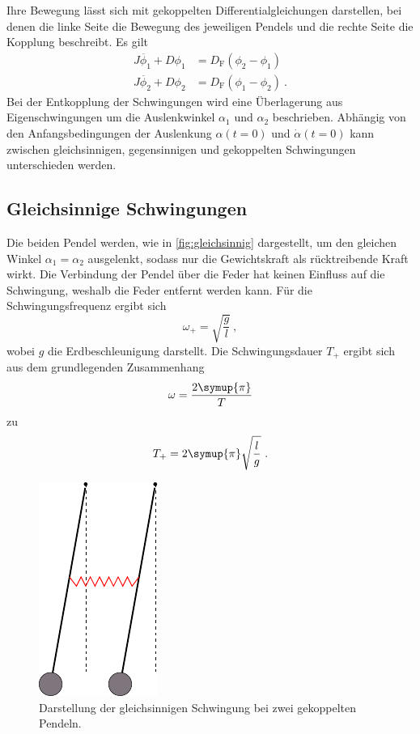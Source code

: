     Ihre Bewegung lässt sich mit gekoppelten Differentialgleichungen darstellen,
    bei denen die linke Seite die Bewegung des jeweiligen Pendels
    und die rechte Seite die Kopplung beschreibt.
    Es gilt
    \begin{align*}
        J \ddot{\phi_1} + D \phi_1 &= D_\text{F}(\phi_2 - \phi_1) \\
        J \ddot{\phi_2} + D \phi_2 &= D_\text{F}(\phi_1 - \phi_2) \ .
    \end{align*}
    Bei der Entkopplung der Schwingungen wird eine Überlagerung aus Eigenschwingungen
    um die Auslenkwinkel $\alpha_1$ und $\alpha_2$ beschrieben.
    Abhängig von den Anfangsbedingungen der Auslenkung $\alpha(t=0)$ und $\dot{\alpha}(t=0)$
    kann zwischen gleichsinnigen, gegensinnigen und gekoppelten Schwingungen unterschieden werden.


\subsection{Gleichsinnige Schwingungen}
\label{sec:gleichsinnige_schwingung}

    Die beiden Pendel werden,
    wie in \autoref{fig:gleichsinnig} dargestellt,
    um den gleichen Winkel $\alpha_1 = \alpha_2$ ausgelenkt,
    sodass nur die Gewichtskraft als rücktreibende Kraft wirkt.
    Die Verbindung der Pendel über die Feder hat keinen Einfluss auf die Schwingung,
    weshalb die Feder entfernt werden kann.
    Für die Schwingungsfrequenz ergibt sich
    \begin{equation}
        \omega_+ = \sqrt{\frac{g}{l}} \ ,
        \label{eqn:frequenz_gleichsinnig}
    \end{equation}
    wobei $g$ die Erdbeschleunigung darstellt.
    Die Schwingungsdauer $T_+$ ergibt sich aus dem grundlegenden Zusammenhang
    \begin{equation}
      \omega = \frac{2\symup{\pi}}{T}
      \label{eqn:omega_T}
    \end{equation}
    zu
    \begin{equation}
        T_+ = 2\symup{\pi} \sqrt{\frac{l}{g}} \ .
        \label{eqn:dauer_gleichsinnig}
    \end{equation}

    \begin{figure}
        \centering
        \includegraphics[scale=0.9]{content/img/Abb_1.pdf}
        \caption{Darstellung der gleichsinnigen Schwingung bei zwei gekoppelten Pendeln. \cite{versuchsanleitung}}
        \label{fig:gleichsinnig}
    \end{figure}


